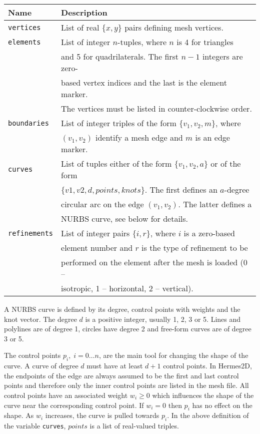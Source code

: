 \begin{center}
\begin{tabular}{|l|l|}
\hline
Name & Description \\
\hline \hline
{\tt vertices} & List of real $\{x, y\}$ pairs defining mesh vertices. \\
\hline
{\tt elements} & List of integer $n$-tuples, where $n$ is 4 for triangles\\
               & and 5 for quadrilaterals. The first $n-1$ integers are zero-\\
               & based vertex indices and the last is the element marker.\\
               & The vertices must be listed in counter-clockwise order.\\
\hline
{\tt boundaries} & List of integer triples of the form $\{ v_1, v_2, m \}$, where \\
                 & $(v_1, v_2)$ identify a mesh edge and $m$ is an edge marker. \\
\hline
{\tt curves} & List of tuples either of the form $\{ v_1, v_2, a \}$ or of the form \\
             & $\{ v1, v2, d, points, knots \}$. The first defines an $a$-degree \\
             & circular arc on the edge $(v_1, v_2)$. The latter defines a\\
             & NURBS curve, see below for details. \\
\hline 
{\tt refinements} & List of integer pairs $\{ i, r \}$, where $i$ is a zero-based \\
                  & element number and $r$ is the type of refinement to be \\
                  & performed on the element after the mesh is loaded (0 --\\
                  &  isotropic, 1 -- horizontal, 2 -- vertical). \\
\hline
\end{tabular}
\end{center}

A NURBS curve is defined by its degree, control points with weights and the knot
vector. The degree $d$ is a positive integer, usually 1, 2, 3 or 5. Lines and polylines
are of degree 1, circles have degree 2 and free-form curves are of degree 3 or 5.

The control points $p_i,\; i = 0 \dots n$, are the main tool for changing the shape of
the curve. A curve of degree $d$ must have at least $d+1$ control points. In Hermes2D,
the endpoints of the edge are always assumed to be the first and last control points 
and therefore only the inner control points are listed in the mesh file.
All control points have an associated weight $w_i \geq 0$ which influences
the shape of the curve near the corresponding control point.
If $w_i = 0$ then $p_i$ has no effect on the shape.
As $w_i$ increases, the curve is pulled towards $p_i$. In the above definition of 
the variable {\tt curves}, $points$ is a list of real-valued triples.

